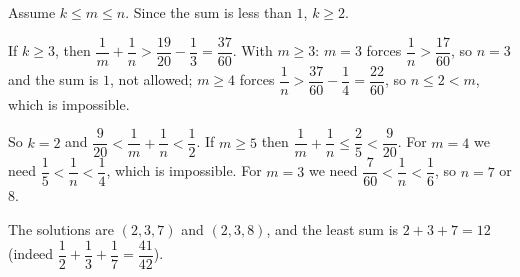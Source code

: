 Assume $k\le m\le n$. Since the sum is less than $1$, $k\ge2$.

If $k\ge3$, then $\dfrac1m+\dfrac1n>\dfrac{19}{20}-\dfrac13=\dfrac{37}{60}$. With $m\ge3$: $m=3$ forces $\dfrac1n>\dfrac{17}{60}$, so $n=3$ and the sum is $1$, not allowed; $m\ge4$ forces $\dfrac1n>\dfrac{37}{60}-\dfrac14=\dfrac{22}{60}$, so $n\le2<m$, which is impossible.

So $k=2$ and $\dfrac9{20}<\dfrac1m+\dfrac1n<\dfrac12$. If $m\ge5$ then $\dfrac1m+\dfrac1n\le\dfrac25<\dfrac9{20}$. For $m=4$ we need $\dfrac15<\dfrac1n<\dfrac14$, which is impossible. For $m=3$ we need $\dfrac7{60}<\dfrac1n<\dfrac16$, so $n=7$ or $8$.

The solutions are $(2,3,7)$ and $(2,3,8)$, and the least sum is $2+3+7=\boxed{12}$ (indeed $\dfrac12+\dfrac13+\dfrac17=\dfrac{41}{42}$).
